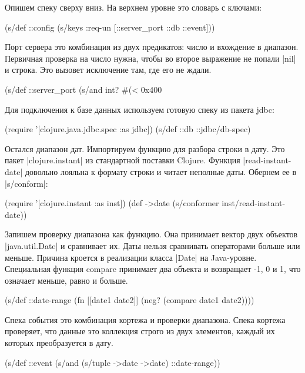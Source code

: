 Опишем спеку сверху вниз. На верхнем уровне это словарь с ключами:

\begin{code}
(s/def ::config
  (s/keys :req-un [::server_port ::db ::event]))
\end{code}

Порт сервера это комбинация из двух предикатов: число и вхождение в
диапазон. Первичная проверка на число нужна, чтобы во второе выражение не попали
\spverb|nil| и строка. Это вызовет исключение там, где его не ждали.

\begin{code}
(s/def ::server_port
  (s/and int? #(< 0x400 %
\end{code}

Для подключения к базе данных используем готовую спеку из пакета jdbc:

\begin{code}
(require '[clojure.java.jdbc.spec :as jdbc])
(s/def ::db ::jdbc/db-spec)
\end{code}

Остался диапазон дат. Импортируем функцию для разбора строки в дату. Это пакет
\spverb|clojure.instant| из стандартной поставки Clojure. Функция \spverb|read-instant-date|
довольно лояльна к формату строки и читает неполные даты. Обернем ее в
\spverb|s/conform|:

\begin{code}
(require '[clojure.instant :as inst])
(def ->date (s/conformer inst/read-instant-date))
\end{code}

Запишем проверку диапазона как функцию. Она принимает вектор двух объектов
\spverb|java.util.Date| и сравнивает их. Даты нельзя сравнивать операторами больше или
меньше. Причина кроется в реализации класса \spverb|Date| на Java-уровне. Специальная
функция compare принимает два объекта и возвращает -1, 0 и 1, что означает
меньше, равно и больше.

\begin{code}
(s/def ::date-range
  (fn [[date1 date2]]
    (neg? (compare date1 date2))))
\end{code}

Спека события это комбинация кортежа и проверки диапазона. Спека кортежа
проверяет, что данные это коллекция строго из двух элементов, каждый их которых
преобразуется в дату.

\begin{code}
(s/def ::event
  (s/and
   (s/tuple ->date ->date)
   ::date-range))
\end{code}

